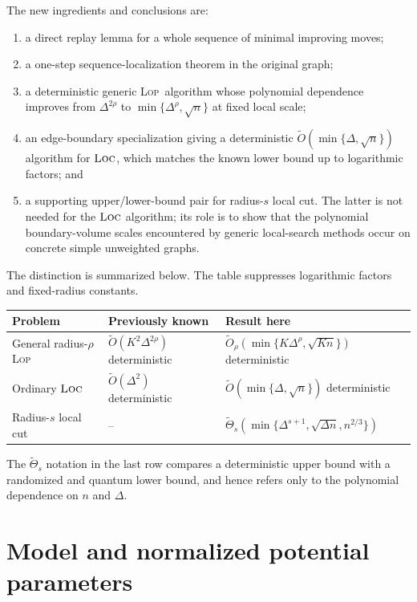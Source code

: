 \documentclass[11pt]{article}
\theoremstyle{definition}
\theoremstyle{remark}
\newcommand{\LOC}{\textnormal{\textsc{Loc}}}
\newcommand{\LOP}{\textnormal{\textsc{Lop}}}
\begin{document}
The new ingredients and conclusions are:
\begin{enumerate}
  \item a direct replay lemma for a whole sequence of minimal improving moves;
  \item a one-step sequence-localization theorem in the original graph;
  \item a deterministic generic \LOP\ algorithm whose polynomial dependence improves
  from $\Delta^{2\rho}$ to $\min\{\Delta^\rho,\sqrt n\}$ at fixed local scale;
  \item an edge-boundary specialization giving a deterministic
  $\widetilde O(\min\{\Delta,\sqrt n\})$ algorithm for $\LOC$, which matches the
  known lower bound up to logarithmic factors; and
  \item a supporting upper/lower-bound pair for radius-$s$ local cut.  The latter is
  not needed for the $\LOC$ algorithm; its role is to show that the polynomial
  boundary-volume scales encountered by generic local-search methods occur on
  concrete simple unweighted graphs.
\end{enumerate}

The distinction is summarized below.  The table suppresses logarithmic factors and
fixed-radius constants.
\begin{center}
\begin{tabular}{@{}lll@{}}
\toprule
Problem & Previously known & Result here \\
\midrule
General radius-$\rho$ \LOP
  & $\widetilde O(K^2\Delta^{2\rho})$ deterministic
  & $\widetilde O_\rho(\min\{K\Delta^\rho,\sqrt{Kn}\})$ deterministic \\
Ordinary $\LOC$
  & $\widetilde O(\Delta^2)$ deterministic
  & $\widetilde O(\min\{\Delta,\sqrt n\})$ deterministic \\
Radius-$s$ local cut
  & --
  & $\widetilde\Theta_s(\min\{\Delta^{s+1},\sqrt{\Delta n},n^{2/3}\})$ \\
\bottomrule
\end{tabular}
\end{center}
The $\widetilde\Theta_s$ notation in the last row compares a deterministic upper
bound with a randomized and quantum lower bound, and hence refers only to the
polynomial dependence on $n$ and $\Delta$.

\section{Model and normalized potential parameters}
\end{document}
